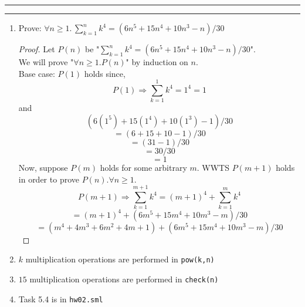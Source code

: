 \documentclass[11pt]{article}
\newcommand{\question}[2] {\vspace{.25in} \hrule\vspace{0.5em}
\noindent{\bf #1: #2} \vspace{0.5em}
\hrule \vspace{.10in}}
\begin{document}
\question{5}{Sums of Powers}
\begin{enumerate}
\item Prove: $\forall n \geq 1.\, \sum_{k=1}^{n}k^4 = (6n^5 + 15n^4 + 10n^3 - n)/30$\\
\begin{proof}
Let $P(n)$ be "$\sum_{k=1}^{n}k^4 = (6n^5 + 15n^4 + 10n^3 - n)/30$".\\
We will prove "$\forall n \geq 1. P(n)$" by induction on $n$.\\
Base case: $P(1)$ holds since,
\[ P(1) \Rightarrow \sum_{k=1}^{1}k^4 = 1^4 = 1 \]
and 
\[(6(1^5) + 15(1^4) + 10(1^3) - 1)/30\]
\[= (6 + 15 + 10 - 1)/30\]
\[= (31 - 1)/30\]
\[= 30/30\]
\[= 1\]
Now, suppose $P(m)$ holds for some arbitrary $m$.  WWTS $P(m+1)$ holds in order to prove $P(n). \forall n \geq 1$.
\[P(m+1) \Rightarrow \sum_{k=1}^{m+1}k^4 = (m+1)^4 + \sum_{k=1}^{m}k^4\]
\[ = (m+1)^4 + (6m^5 + 15m^4 + 10m^3 - m)/30 \]
\[ = (m^4 + 4m^3 + 6m^2 + 4m + 1) + (6m^5 + 15m^4 + 10m^3 - m)/30 \]
\end{proof}
\item $k$ multiplication operations are performed in \verb|pow(k,n)|
\item $15$ multiplication operations are performed in \verb|check(n)|
\item Task 5.4 is in \verb|hw02.sml|
\end{enumerate}
\end{document}
